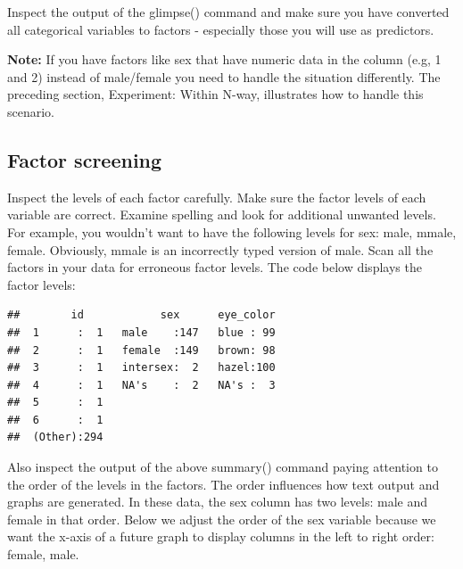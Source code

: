\documentclass[
]{krantz}
\makeatletter
\newenvironment{Shaded}{\begin{snugshade}}{\end{snugshade}}
\newcommand{\KeywordTok}[1]{\textcolor[rgb]{0.27,0.27,0.27}{\textbf{#1}}}
\newcommand{\NormalTok}[1]{#1}
\newcommand{\OperatorTok}[1]{\textcolor[rgb]{0.43,0.43,0.43}{\textbf{#1}}}
\newcommand{\StringTok}[1]{\textcolor[rgb]{0.5,0.5,0.5}{#1}}
\newenvironment{kframe}{%
\medskip{}
\setlength{\fboxsep}{.8em}
 \def\at@end@of@kframe{}%
 \ifinner\ifhmode%
  \def\at@end@of@kframe{\end{minipage}}%
  \begin{minipage}{\columnwidth}%
 \fi\fi%
 \def\FrameCommand##1{\hskip\@totalleftmargin \hskip-\fboxsep
 \colorbox{shadecolor}{##1}\hskip-\fboxsep
     \hskip-\linewidth \hskip-\@totalleftmargin \hskip\columnwidth}%
 \MakeFramed {\advance\hsize-\width
   \@totalleftmargin\z@ \linewidth\hsize
   \@setminipage}}%
 {\par\unskip\endMakeFramed%
 \at@end@of@kframe}
\renewenvironment{Shaded}{\begin{kframe}}{\end{kframe}}
\makeatother
\begin{document}
Inspect the output of the glimpse() command and make sure you have converted all categorical variables to factors - especially those you will use as predictors.

\textbf{Note:} If you have factors like sex that have numeric data in the column (e.g, 1 and 2) instead of male/female you need to handle the situation differently. The preceding section, Experiment: Within N-way, illustrates how to handle this scenario.

\hypertarget{factor-screening-4}{%
\subsection{Factor screening}\label{factor-screening-4}}

Inspect the levels of each factor carefully. Make sure the factor levels of each variable are correct. Examine spelling and look for additional unwanted levels. For example, you wouldn't want to have the following levels for sex: male, mmale, female. Obviously, mmale is an incorrectly typed version of male. Scan all the factors in your data for erroneous factor levels. The code below displays the factor levels:

\begin{Shaded}
\end{Shaded}

\begin{verbatim}
##        id            sex      eye_color  
##  1      :  1   male    :147   blue : 99  
##  2      :  1   female  :149   brown: 98  
##  3      :  1   intersex:  2   hazel:100  
##  4      :  1   NA's    :  2   NA's :  3  
##  5      :  1                             
##  6      :  1                             
##  (Other):294
\end{verbatim}

Also inspect the output of the above summary() command paying attention to the order of the levels in the factors. The order influences how text output and graphs are generated. In these data, the sex column has two levels: male and female in that order. Below we adjust the order of the sex variable because we want the x-axis of a future graph to display columns in the left to right order: female, male.
\end{document}
